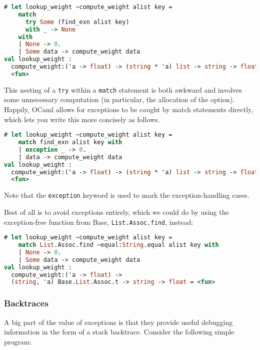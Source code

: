 \begin{lstlisting}[language=Caml]
# let lookup_weight ~compute_weight alist key =
    match
      try Some (find_exn alist key)
      with _ -> None
    with
    | None -> 0.
    | Some data -> compute_weight data
val lookup_weight :
  compute_weight:('a -> float) -> (string * 'a) list -> string -> float =
  <fun>
\end{lstlisting}

This nesting of a \passthrough{\lstinline!try!} within a
\passthrough{\lstinline!match!} statement is both awkward and involves
some unnecessary computation (in particular, the allocation of the
option). Happily, OCaml allows for exceptions to be caught by match
statements directly, which lets you write this more concisely as
follows.

\begin{lstlisting}[language=Caml]
# let lookup_weight ~compute_weight alist key =
    match find_exn alist key with
    | exception _ -> 0.
    | data -> compute_weight data
val lookup_weight :
  compute_weight:('a -> float) -> (string * 'a) list -> string -> float =
  <fun>
\end{lstlisting}

Note that the \passthrough{\lstinline!exception!} keyword is used to
mark the exception-handling cases.

Best of all is to avoid exceptions entirely, which we could do by using
the exception-free function from Base,
\passthrough{\lstinline!List.Assoc.find!}, instead:

\begin{lstlisting}[language=Caml]
# let lookup_weight ~compute_weight alist key =
    match List.Assoc.find ~equal:String.equal alist key with
    | None -> 0.
    | Some data -> compute_weight data
val lookup_weight :
  compute_weight:('a -> float) ->
  (string, 'a) Base.List.Assoc.t -> string -> float = <fun>
\end{lstlisting}

\hypertarget{backtraces}{%
\subsubsection{Backtraces}\label{backtraces}}

A big part of the value of exceptions is that they provide useful
debugging information in the form of a stack backtrace. Consider the
following simple program:


